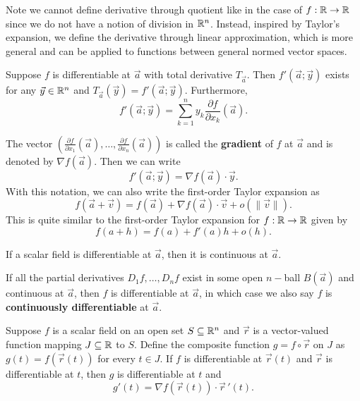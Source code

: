 \documentclass[a4paper]{ctexart}
\begin{document}
    \begin{myrmk}
        Note we cannot define derivative through quotient like in the case of $f:\mathbb{R} \to \mathbb{R}$ since we do not have a notion of division in $\mathbb{R}^n$. Instead, inspired by Taylor's expansion, we define the derivative through linear approximation, which is more general and can be applied to functions between general normed vector spaces.
    \end{myrmk}
    \begin{mythm}
        Suppose $f$ is differentiable at $\vec a$ with total derivative $T_{\vec a}$. Then $f'(\vec a; \vec y)$ exists for any $\vec y\in \mathbb{R}^n$ and $T_{\vec a}(\vec y) = f'(\vec a; \vec y)$. Furthermore, 
        $$ f'(\vec a; \vec y) = \sum_{k=1}^n y_k \frac{\partial f}{\partial x_k}(\vec a). $$
    \end{mythm}
    \begin{mynot}
        The vector $\displaystyle\left(\frac{\partial f}{\partial x_1}(\vec a), \ldots, \frac{\partial f}{\partial x_n}(\vec a)\right)$ is called the \textbf{gradient} of $f$ at $\vec a$ and is denoted by $\nabla f(\vec a)$. Then we can write $$f'(\vec a; \vec y) = \nabla f(\vec a) \cdot \vec y.$$
        With this notation, we can also write the first-order Taylor expansion as
        $$ f(\vec a + \vec v) = f(\vec a) + \nabla f(\vec a) \cdot \vec v + o(\|\vec v\|). $$
        This is quite similar to the first-order Taylor expansion for $f:\mathbb{R} \to \mathbb{R}$ given by
        $$ f(a + h) = f(a) + f'(a) h + o(h). $$
    \end{mynot}
    \begin{mythm}
        If a scalar field is differentiable at $\vec a$, then it is continuous at $\vec a$.
    \end{mythm}
    \begin{mythm}
        If all the partial derivatives $D_1 f, \ldots, D_n f$ exist in some open $n-$ball $B(\vec a)$ and continuous at $\vec a$, then $f$ is differentiable at $\vec a$, in which case we also say $f$ is \textbf{continuously differentiable} at $\vec a$.
    \end{mythm}
    \begin{mythm}
        Suppose $f$ is a scalar field on an open set $S\subseteq \mathbb{R}^n$ and $\vec r$ is a vector-valued function mapping $J\subseteq \mathbb{R}$ to $S$. Define the composite function $g = f \circ \vec r$ on $J$ as $g(t) = f(\vec r(t))$ for every $t\in J$. If $f$ is differentiable at $\vec r(t)$ and $\vec r$ is differentiable at $t$, then $g$ is differentiable at $t$ and
        $$ g'(t) = \nabla f(\vec r(t)) \cdot \vec r\,'(t). $$
    \end{mythm}
\end{document}
